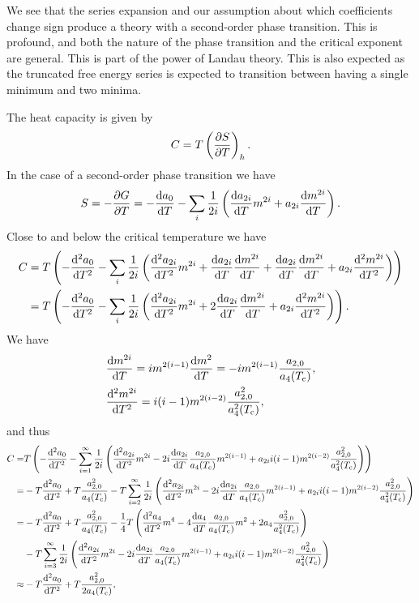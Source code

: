 We see that the series expansion and our assumption about which coefficients change sign produce a theory with a second-order phase transition. This is profound, and both the nature of the phase transition and the critical exponent are general. This is part of the power of Landau theory. This is also expected as the truncated free energy series is expected to transition between having a single minimum and two minima.

The heat capacity is given by
\begin{align*}
	C = T\left(\pdv{S}{T}\right)_{h}.
\end{align*}
In the case of a second-order phase transition we have
\begin{align*}
	S = -\pdv{G}{T} = -\dv{a_{0}}{T} - \sum\limits_{i}\frac{1}{2i}\left(\dv{a_{2i}}{T}m^{2i} + a_{2i}\dv{m^{2i}}{T}\right).
\end{align*}
Close to and below the critical temperature we have
\begin{align*}
	C &= T\left(-\dv[2]{a_{0}}{T} - \sum\limits_{i}\frac{1}{2i}\left(\dv[2]{a_{2i}}{T}m^{2i} + \dv{a_{2i}}{T}\dv{m^{2i}}{T} + \dv{a_{2i}}{T}\dv{m^{2i}}{T} + a_{2i}\dv[2]{m^{2i}}{T}\right)\right) \\
	  &= T\left(-\dv[2]{a_{0}}{T} - \sum\limits_{i}\frac{1}{2i}\left(\dv[2]{a_{2i}}{T}m^{2i} + 2\dv{a_{2i}}{T}\dv{m^{2i}}{T} + a_{2i}\dv[2]{m^{2i}}{T}\right)\right).
\end{align*}
We have
\begin{align*}
	&\dv{m^{2i}}{T} = im^{2(i - 1)}\dv{m^{2}}{T} = -im^{2(i - 1)}\frac{a_{2, 0}}{a_{4}(T_{\text{c}})}, \\
	&\dv[2]{m^{2i}}{T} = i(i - 1)m^{2(i - 2)}\frac{a_{2, 0}^{2}}{a_{4}^{2}(T_{\text{c}})},
\end{align*}
and thus
\begin{align*}
	C =& T\left(-\dv[2]{a_{0}}{T} - \sum\limits_{i = 1}^{\infty}\frac{1}{2i}\left(\dv[2]{a_{2i}}{T}m^{2i} - 2i\dv{a_{2i}}{T}\frac{a_{2, 0}}{a_{4}(T_{\text{c}})}m^{2(i - 1)} + a_{2i}i(i - 1)m^{2(i - 2)}\frac{a_{2, 0}^{2}}{a_{4}^{2}(T_{\text{c}})}\right)\right) \\
	  =& -T\dv[2]{a_{0}}{T} + T\frac{a_{2, 0}^{2}}{a_{4}(T_{\text{c}})} - T\sum\limits_{i = 2}^{\infty}\frac{1}{2i}\left(\dv[2]{a_{2i}}{T}m^{2i} - 2i\dv{a_{2i}}{T}\frac{a_{2, 0}}{a_{4}(T_{\text{c}})}m^{2(i - 1)} + a_{2i}i(i - 1)m^{2(i - 2)}\frac{a_{2, 0}^{2}}{a_{4}^{2}(T_{\text{c}})}\right) \\
	  =& -T\dv[2]{a_{0}}{T} + T\frac{a_{2, 0}^{2}}{a_{4}(T_{\text{c}})} - \frac{1}{4}T\left(\dv[2]{a_{4}}{T}m^{4} - 4\dv{a_{4}}{T}\frac{a_{2, 0}}{a_{4}(T_{\text{c}})}m^{2} + 2a_{4}\frac{a_{2, 0}^{2}}{a_{4}^{2}(T_{\text{c}})}\right) \\
	   &- T\sum\limits_{i = 3}^{\infty}\frac{1}{2i}\left(\dv[2]{a_{2i}}{T}m^{2i} - 2i\dv{a_{2i}}{T}\frac{a_{2, 0}}{a_{4}(T_{\text{c}})}m^{2(i - 1)} + a_{2i}i(i - 1)m^{2(i - 2)}\frac{a_{2, 0}^{2}}{a_{4}^{2}(T_{\text{c}})}\right) \\
	  \approx& -T\dv[2]{a_{0}}{T} + T\frac{a_{2, 0}^{2}}{2a_{4}(T_{\text{c}})},
\end{align*}

